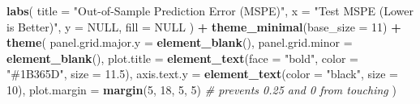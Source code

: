 \documentclass[
]{article}
\newenvironment{Shaded}{\begin{snugshade}}{\end{snugshade}}
\newcommand{\AttributeTok}[1]{\textcolor[rgb]{0.13,0.29,0.53}{#1}}
\newcommand{\CommentTok}[1]{\textcolor[rgb]{0.56,0.35,0.01}{\textit{#1}}}
\newcommand{\ConstantTok}[1]{\textcolor[rgb]{0.56,0.35,0.01}{#1}}
\newcommand{\DecValTok}[1]{\textcolor[rgb]{0.00,0.00,0.81}{#1}}
\newcommand{\FloatTok}[1]{\textcolor[rgb]{0.00,0.00,0.81}{#1}}
\newcommand{\FunctionTok}[1]{\textcolor[rgb]{0.13,0.29,0.53}{\textbf{#1}}}
\newcommand{\NormalTok}[1]{#1}
\newcommand{\SpecialCharTok}[1]{\textcolor[rgb]{0.81,0.36,0.00}{\textbf{#1}}}
\newcommand{\StringTok}[1]{\textcolor[rgb]{0.31,0.60,0.02}{#1}}
\begin{document}
\begin{Shaded}
\begin{Highlighting}[]
  \FunctionTok{labs}\NormalTok{(}
    \AttributeTok{title =} \StringTok{"Out{-}of{-}Sample Prediction Error (MSPE)"}\NormalTok{,}
    \AttributeTok{x     =} \StringTok{"Test MSPE (Lower is Better)"}\NormalTok{,}
    \AttributeTok{y     =} \ConstantTok{NULL}\NormalTok{,}
    \AttributeTok{fill  =} \ConstantTok{NULL}
\NormalTok{  ) }\SpecialCharTok{+}
  \FunctionTok{theme\_minimal}\NormalTok{(}\AttributeTok{base\_size =} \DecValTok{11}\NormalTok{) }\SpecialCharTok{+}
  \FunctionTok{theme}\NormalTok{(}
    \AttributeTok{panel.grid.major.y =} \FunctionTok{element\_blank}\NormalTok{(),}
    \AttributeTok{panel.grid.minor   =} \FunctionTok{element\_blank}\NormalTok{(),}
    \AttributeTok{plot.title         =} \FunctionTok{element\_text}\NormalTok{(}\AttributeTok{face =} \StringTok{"bold"}\NormalTok{, }\AttributeTok{color =} \StringTok{"\#1B365D"}\NormalTok{, }\AttributeTok{size =} \FloatTok{11.5}\NormalTok{),}
    \AttributeTok{axis.text.y        =} \FunctionTok{element\_text}\NormalTok{(}\AttributeTok{color =} \StringTok{"black"}\NormalTok{, }\AttributeTok{size =} \DecValTok{10}\NormalTok{),}
    \AttributeTok{plot.margin        =} \FunctionTok{margin}\NormalTok{(}\DecValTok{5}\NormalTok{, }\DecValTok{18}\NormalTok{, }\DecValTok{5}\NormalTok{, }\DecValTok{5}\NormalTok{)  }\CommentTok{\# prevents 0.25 and 0 from touching}
\NormalTok{  )}


\end{Highlighting}
\end{Shaded}
\end{document}
